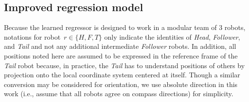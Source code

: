 \documentclass[letterpaper, 10 pt, conference]{ieeeconf}  %
\begin{document}
	\subsection{Improved regression model}
	\label{sec:regression_model}

    Because the learned regressor is designed to work in a modular team
    of $3$ robots, notations for robot~$r \in \{H, F, T\}$ only indicate
    the identities of \emph{Head}, \emph{Follower}, and \emph{Tail} and
    not any additional intermediate \emph{Follower} robots. In addition,
    all positions noted here are assumed to be expressed in the
    reference frame of the \emph{Tail} robot because, in practice, the
    \emph{Tail} has to understand positions of others by projection onto
    the local coordinate system centered at itself. Though a similar
    conversion may be considered for orientation, we use absolute
    direction in this work (i.e., assume that all robots agree on
    compass directions) for simplicity.
\end{document}
